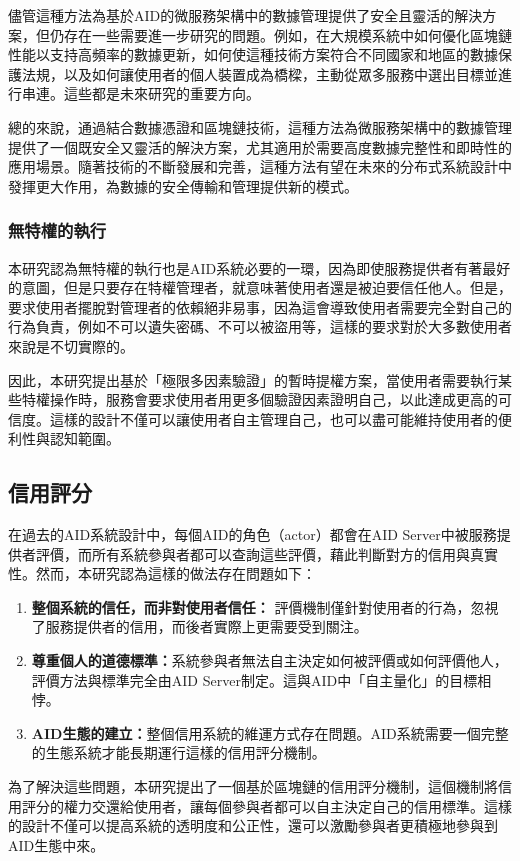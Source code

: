 儘管這種方法為基於AID的微服務架構中的數據管理提供了安全且靈活的解決方案，但仍存在一些需要進一步研究的問題。例如，在大規模系統中如何優化區塊鏈性能以支持高頻率的數據更新，如何使這種技術方案符合不同國家和地區的數據保護法規，以及如何讓使用者的個人裝置成為橋樑，主動從眾多服務中選出目標並進行串連。這些都是未來研究的重要方向。

總的來說，通過結合數據憑證和區塊鏈技術，這種方法為微服務架構中的數據管理提供了一個既安全又靈活的解決方案，尤其適用於需要高度數據完整性和即時性的應用場景。隨著技術的不斷發展和完善，這種方法有望在未來的分布式系統設計中發揮更大作用，為數據的安全傳輸和管理提供新的模式。
\subsubsection{無特權的執行}
本研究認為無特權的執行也是AID系統必要的一環，因為即使服務提供者有著最好的意圖，但是只要存在特權管理者，就意味著使用者還是被迫要信任他人。但是，要求使用者擺脫對管理者的依賴絕非易事，因為這會導致使用者需要完全對自己的行為負責，例如不可以遺失密碼、不可以被盜用等，這樣的要求對於大多數使用者來說是不切實際的。

因此，本研究提出基於「極限多因素驗證」的暫時提權方案，當使用者需要執行某些特權操作時，服務會要求使用者用更多個驗證因素證明自己，以此達成更高的可信度。這樣的設計不僅可以讓使用者自主管理自己，也可以盡可能維持使用者的便利性與認知範圍。
\subsection{信用評分}
在過去的AID系統設計中，每個AID的角色（actor）都會在AID Server中被服務提供者評價，而所有系統參與者都可以查詢這些評價，藉此判斷對方的信用與真實性。然而，本研究認為這樣的做法存在問題如下：
\begin{enumerate}
  \item \textbf{整個系統的信任，而非對使用者信任：} 評價機制僅針對使用者的行為，忽視了服務提供者的信用，而後者實際上更需要受到關注。
  \item \textbf{尊重個人的道德標準：}系統參與者無法自主決定如何被評價或如何評價他人，評價方法與標準完全由AID Server制定。這與AID中「自主量化」的目標相悖。
  \item \textbf{AID生態的建立：}整個信用系統的維運方式存在問題。AID系統需要一個完整的生態系統才能長期運行這樣的信用評分機制。
\end{enumerate}
為了解決這些問題，本研究提出了一個基於區塊鏈的信用評分機制，這個機制將信用評分的權力交還給使用者，讓每個參與者都可以自主決定自己的信用標準。這樣的設計不僅可以提高系統的透明度和公正性，還可以激勵參與者更積極地參與到AID生態中來。
